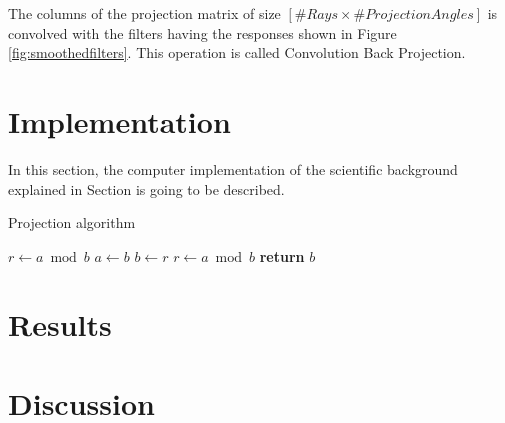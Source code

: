 \documentclass[journal]{IEEEtran}
\begin{document}
The columns of the projection matrix of size $[\#Rays \times \#Projection Angles]$ is convolved with the filters having the responses shown in Figure \ref{fig:smoothedfilters}. This operation is called Convolution Back Projection.

\section{Implementation} \label{sec:implementation}

In this section, the computer implementation of the scientific background explained in Section  is going to be described.

\begin{algorithm}[h]
	\caption{Projection algorithm}\label{euclid}
	\begin{algorithmic}
	   \State $r\gets a\bmod b$
		  \State $a\gets b$
		  \State $b\gets r$
		  \State $r\gets a\bmod b$
	   \EndWhile\label{euclidendwhile}
	   \State \textbf{return} $b$
	\EndProcedure
	\end{algorithmic}
	\label{alg:projection}
\end{algorithm}

\section{Results} \label{sec:results}

\section{Discussion} \label{sec:discuss}

\printbibliography
\end{document}
